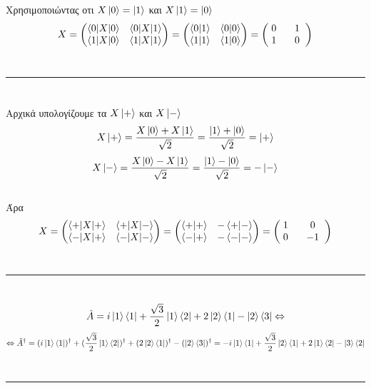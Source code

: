 \documentclass[12pt]{article}
\begin{document}
\section*{{}}
Χρησιμοποιώντας οτι $X\ket{0} = \ket{1} $ και $X\ket{1} = \ket{0} $
$$ X = \begin{pmatrix}\braket{0|X|0} & \braket{0|X|1} \\ \braket{1|X|0}&\braket{1|X|1}\end{pmatrix}
= \begin{pmatrix}\braket{0|1} & \braket{0|0} \\ \braket{1|1}&\braket{1|0}\end{pmatrix}=\begin{pmatrix}\;0 \;\;\;& 1\; \;\\\; 1\;\;\;&0\;\;\end{pmatrix}$$
\\\rule{\textwidth}{.5pt}
\section*{{}}
Aρχικά υπολογίζουμε τα $X\ket{+}$ και $X\ket{-}$
$$X\ket{+} = \frac{X\ket{0}+X\ket{1}}{\sqrt{2}} = \frac{\ket{1}+\ket{0}}{\sqrt{2}} = \ket{+}$$
$$X\ket{-} = \frac{X\ket{0}-X\ket{1}}{\sqrt{2}} = \frac{\ket{1}-\ket{0}}{\sqrt{2}} = -\ket{-}$$\\
Άρα
$$ X = \begin{pmatrix}\braket{+|X|+} & \braket{+|X|-} \\ \braket{-|X|+}&\braket{-|X|-}\end{pmatrix}
= \begin{pmatrix}\braket{+|+} & -\braket{+|-} \\ \braket{-|+}&-\braket{-|-}\end{pmatrix}=\begin{pmatrix}\;1 \;\;\;& 0\; \;\\\; 0\;\;\;&-1\;\;\end{pmatrix}$$
\\\rule{\textwidth}{.5pt}
\section*{{}}

$$\hat {A} = i\ket{1}\bra{1} + \frac{\sqrt{3}}{2}\ket{1}\bra{2} + 2\ket{2}\bra{1} - \ket{2}\bra{3}\Leftrightarrow$$
$$\Leftrightarrow \hat {A}^\dag = (i\ket{1}\bra{1} )^\dag + (\frac{\sqrt{3}}{2}\ket{1}\bra{2})^\dag + (2\ket{2}\bra{1})^\dag - (\ket{2}\bra{3})^\dag=-i\ket{1}\bra{1} + \frac{\sqrt{3}}{2}\ket{2}\bra{1} + 2\ket{1}\bra{2} - \ket{3}\bra{2}$$
\\\rule{\textwidth}{.5pt}
\end{document}
